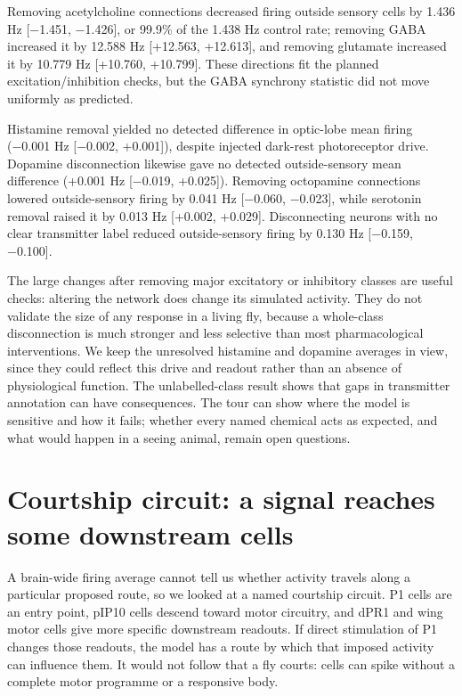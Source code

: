 \documentclass[11pt]{article}
\begin{document}
Removing acetylcholine connections decreased firing outside sensory cells by 1.436 Hz [−1.451, −1.426], or 99.9\% of the 1.438 Hz control rate; removing GABA increased it by 12.588 Hz [+12.563, +12.613], and removing glutamate increased it by 10.779 Hz [+10.760, +10.799]. These directions fit the planned excitation/inhibition checks, but the GABA synchrony statistic did not move uniformly as predicted.

Histamine removal yielded no detected difference in optic-lobe mean firing (−0.001 Hz [−0.002, +0.001]), despite injected dark-rest photoreceptor drive. Dopamine disconnection likewise gave no detected outside-sensory mean difference (+0.001 Hz [−0.019, +0.025]). Removing octopamine connections lowered outside-sensory firing by 0.041 Hz [−0.060, −0.023], while serotonin removal raised it by 0.013 Hz [+0.002, +0.029]. Disconnecting neurons with no clear transmitter label reduced outside-sensory firing by 0.130 Hz [−0.159, −0.100].

The large changes after removing major excitatory or inhibitory classes are useful checks: altering the network does change its simulated activity. They do not validate the size of any response in a living fly, because a whole-class disconnection is much stronger and less selective than most pharmacological interventions. We keep the unresolved histamine and dopamine averages in view, since they could reflect this drive and readout rather than an absence of physiological function. The unlabelled-class result shows that gaps in transmitter annotation can have consequences. The tour can show where the model is sensitive and how it fails; whether every named chemical acts as expected, and what would happen in a seeing animal, remain open questions.

\section*{Courtship circuit: a signal reaches some downstream cells}
A brain-wide firing average cannot tell us whether activity travels along a particular proposed route, so we looked at a named courtship circuit. P1 cells are an entry point, pIP10 cells descend toward motor circuitry, and dPR1 and wing motor cells give more specific downstream readouts. If direct stimulation of P1 changes those readouts, the model has a route by which that imposed activity can influence them. It would not follow that a fly courts: cells can spike without a complete motor programme or a responsive body.
\end{document}
